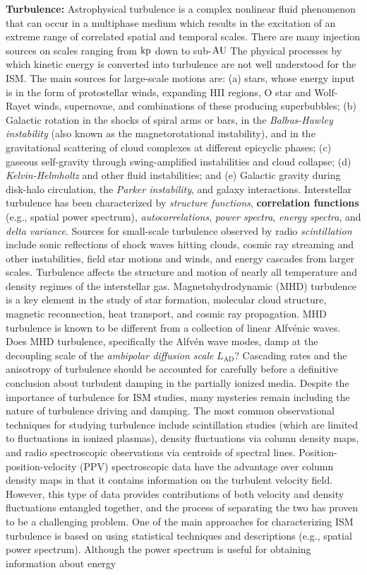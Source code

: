 \documentclass[a4paper,10pt]{article}
\begin{document}
{\noindent}\textbf{Turbulence:} Astrophysical turbulence is a complex nonlinear fluid phenomenon that can occur in a multiphase medium which results in the excitation of an extreme range of correlated spatial and temporal scales. There are many injection sources on scales ranging from ${\rm kp}$ down to sub-${\rm AU}$ The physical processes by which kinetic energy is converted into turbulence are not well understood for the ISM. The main sources for large-scale motions are: (a) stars, whose energy input is in the form of protostellar winds, expanding HII regions, O star and Wolf-Rayet winds, supernovae, and combinations of these producing superbubbles; (b) Galactic rotation in the shocks of spiral arms or bars, in the \textit{Balbus-Hawley instability} (also known as the magnetorotational instability), and in the gravitational scattering of cloud complexes at different epicyclic phases; (c) gaseous self-gravity through swing-amplified instabilities and cloud collapse; (d) \textit{Kelvin-Helmholtz} and other fluid instabilities; and (e) Galactic gravity during disk-halo circulation, the \textit{Parker instability}, and galaxy interactions. Interstellar turbulence has been characterized by \textit{structure functions}, \textbf{correlation functions} (e.g., spatial power spectrum), \textit{autocorrelations}, \textit{power spectra}, \textit{energy spectra}, and \textit{delta variance}. Sources for small-scale turbulence observed by radio \textit{scintillation} include sonic reflections of shock waves hitting clouds, cosmic ray streaming and other instabilities, field star motions and winds, and energy cascades from larger scales. Turbulence affects the structure and motion of nearly all temperature and density regimes of the interstellar gas. Magnetohydrodynamic (MHD) turbulence is a key element in the study of star formation, molecular cloud structure, magnetic reconnection, heat transport, and cosmic ray propagation. MHD turbulence is known to be different from a collection of linear Alfv\'enic waves. Does MHD turbulence, specifically the Alfv\'en wave modes, damp at the decoupling scale of the \textit{ambipolar diffusion scale} $L_\mathrm{AD}$? Cascading rates and the anisotropy of turbulence should be accounted for carefully before a definitive conclusion about turbulent damping in the partially ionized media. Despite the importance of turbulence for ISM studies, many mysteries remain including the nature of turbulence driving and damping. The most common observational techniques for studying turbulence include scintillation studies (which are limited to fluctuations in ionized plasmas), density fluctuations via column density maps, and radio spectroscopic observations via centroids of spectral lines. Position-position-velocity (PPV) spectroscopic data have the advantage over column density maps in that it contains information on the turbulent velocity field. However, this type of data provides contributions of both velocity and density fluctuations entangled together, and the process of separating the two has proven to be a challenging problem. One of the main approaches for characterizing ISM turbulence is based on using statistical techniques and descriptions (e.g., spatial power spectrum). Although the power spectrum is useful for obtaining information about energy 
\end{document}
